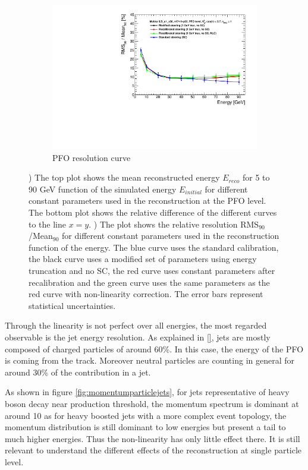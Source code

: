 \begin{figure}[htbp!]
\begin{subfigure}[t]{0.45\textwidth}
    \includegraphics[width=1\linewidth]{../Thesis_Plots/ILD/NoSmearing/Plots_Comparison/Comparison_resolution_Curves_PFO}
    \caption{PFO resolution curve} \label{fig:resopfo}
  \end{subfigure}
  \caption{) The top plot shows the mean reconstructed energy $E_{reco}$ for 5 to 90 GeV \kzeroL{} function of the simulated energy $E_{initial}$ for different constant parameters used in the reconstruction at the PFO level. The bottom plot shows the relative difference of the different curves to the line $x = y$. ) The plot shows the relative resolution RMS$_{90}$/Mean$_{90}$ for different constant parameters used in the reconstruction function of the energy. The blue curve uses the standard calibration, the black curve uses a modified set of parameters using energy truncation and no SC, the red curve uses constant parameters after recalibration and the green curve uses the same parameters as the red curve with non-linearity correction. The error bars represent statistical uncertainties.}
\end{figure}

Through the linearity is not perfect over all energies, the most regarded observable is the jet energy resolution. As explained in \ref{}, jets are mostly composed of charged particles of around 60\%. In this case, the energy of the PFO is coming from the track. Moreover neutral particles are counting in general for around 30\% of the contribution in a jet.

As shown in figure \ref{fig:momentumparticlejets}, for jets representative of heavy boson decay near production threshold, the momentum spectrum is dominant at around 10 \GeV as for heavy boosted jets with a more complex event topology, the momentum distribution is still dominant to low energies but present a tail to much higher energies. Thus the non-linearity has only little effect there. It is still relevant to understand the different effects of the reconstruction at single particle level.

